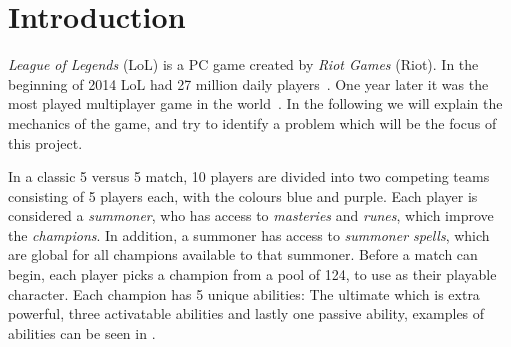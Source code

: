 \section{Introduction}\label{sec:intro}



\emph{League of Legends} (LoL) is a PC game created by \emph{Riot Games} (Riot). In the beginning of 2014 LoL had 27 million daily players~\cite{LoL27mill}. One year later it was the most played multiplayer game in the world~\cite{LoLmostplayed}. 
In the following we will explain the mechanics of the game, and try to identify a problem which will be the focus of this project. 

In a classic 5 versus 5 match, 10 players are divided into two competing teams consisting of 5 players each, with the colours blue and purple. Each player is considered a \emph{summoner}, who has access to \emph{masteries} and \emph{runes}, which improve the \emph{champions}. In addition, a summoner has access to \emph{summoner spells}, which are global for all champions available to that summoner. Before a match can begin, each player picks a champion from a pool of 124, to use as their playable character. Each champion has 5 unique abilities: The ultimate which is extra powerful, three activatable abilities and lastly one passive ability, examples of abilities can be seen in .

